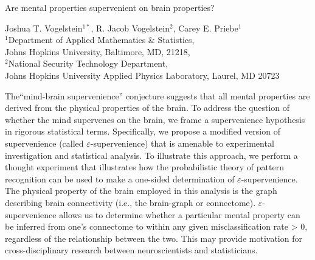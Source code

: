 \documentclass{article}
\newcommand{\eps}{\varepsilon}
\begin{document}
	\begin{center}
{\huge	Are mental properties supervenient on brain properties?}
\end{center}

\vspace{5px}

\begin{center}
{\large		
Joshua T. Vogelstein$^{1*}$, R. Jacob Vogelstein$^2$, Carey E. Priebe$^1$\\
	$^1$Department of Applied Mathematics \& Statistics, \\ Johns Hopkins University, Baltimore, MD, 21218,\\ $^2$National Security Technology Department, \\ Johns Hopkins University Applied Physics Laboratory, Laurel, MD 20723}
	
\end{center}

\vspace{5px}

	
\noindent The``mind-brain supervenience'' conjecture suggests that all mental properties are derived from the physical properties of the brain. To address the question of whether the mind supervenes on the brain, we frame a supervenience hypothesis in rigorous statistical terms. Specifically, we propose a modified version of supervenience (called $\eps$-supervenience) that is amenable to experimental investigation and statistical analysis. To illustrate this approach, we perform a thought experiment that illustrates how the probabilistic theory of pattern recognition can be used to make a one-sided determination of $\eps$-supervenience. The physical property of the brain employed in this analysis is the graph describing brain connectivity (i.e., the brain-graph or connectome). $\eps$-supervenience allows us to determine whether a particular mental property can be inferred from one's connectome to within any given misclassification rate > 0, regardless of the relationship between the two. This may provide motivation for cross-disciplinary research between neuroscientists and statisticians.


\end{document}
